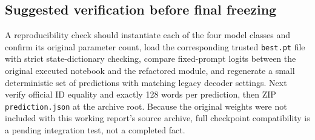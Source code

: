 \documentclass[11pt,a4paper]{article}
\newcommand{\method}[1]{\texttt{#1}}
\begin{document}
\subsection{Suggested verification before final freezing}
A reproducibility check should instantiate each of the four model classes and confirm its original parameter count, load the corresponding trusted \method{best.pt} file with strict state-dictionary checking, compare fixed-prompt logits between the original executed notebook and the refactored module, and regenerate a small deterministic set of predictions with matching legacy decoder settings. Next verify official ID equality and exactly 128 words per prediction, then ZIP \method{prediction.json} at the archive root. Because the original weights were not included with this working report's source archive, full checkpoint compatibility is a pending integration test, not a completed fact.
\end{document}
